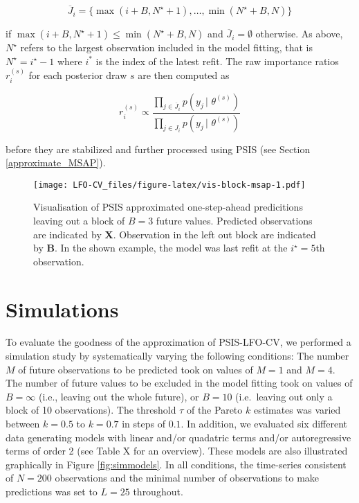 \documentclass[american,]{article}
\begin{document}
\begin{equation}
\overline{J}_i = \{ \max(i + B, N^\star + 1), \ldots, \min(N^\star + B, N) \}
\end{equation}

if \(\max(i + B, N^\star + 1) \leq \min(N^\star + B, N)\) and
\(\overline{J}_i = \emptyset\) otherwise. As above, \(N^\star\) refers to the
largest observation included in the model fitting, that is
\(N^\star = i^\star - 1\) where \(i^*\) is the index of the latest refit. The raw
importance ratios \(r_i^{(s)}\) for each posterior draw \(s\) are then computed as

\begin{equation}
r_i^{(s)} \propto \frac{\prod_{j \in \overline{J}_i} p(y_j \,|\, \,\theta^{(s)})}
{\prod_{j \in J_i} p(y_j \,|\, \,\theta^{(s)})}
\end{equation}

before they are stabilized and further processed using PSIS (see Section
\ref{approximate_MSAP}).

\begin{figure}
\centering
\texttt{[image: LFO-CV\_files/figure-latex/vis-block-msap-1.pdf]}
\caption{\label{fig:vis-block-msap}Visualisation of PSIS approximated one-step-ahead predicitions leaving out a block of \(B = 3\) future values. Predicted observations are indicated by \textbf{X}. Observation in the left out block are indicated by \textbf{B}. In the shown example, the model was last refit at the \(i^\star = 5\)th observation.}
\end{figure}

\hypertarget{simulations}{%
\section{Simulations}\label{simulations}}

To evaluate the goodness of the approximation of PSIS-LFO-CV,
we performed a simulation study by systematically varying the following
conditions: The number \(M\) of future observations to be predicted took on
values of \(M = 1\) and \(M = 4\). The number of future values to be excluded in the model
fitting took on values of \(B = \infty\) (i.e., leaving out the whole future), or
\(B = 10\) (i.e.~leaving out only a block of 10 observations).
The threshold \(\tau\) of the Pareto \(k\) estimates was varied between
\(k = 0.5\) to \(k = 0.7\) in steps of \(0.1\). In addition, we evaluated six
different data generating models with linear and/or quadatric terms and/or
autoregressive terms of order 2 (see Table X for an overview). These models are
also illustrated graphically in Figure \ref{fig:simmodels}. In all conditions,
the time-series consistent of \(N = 200\) observations and the minimal number
of observations to make predictions was set to \(L = 25\) throughout.
\end{document}
